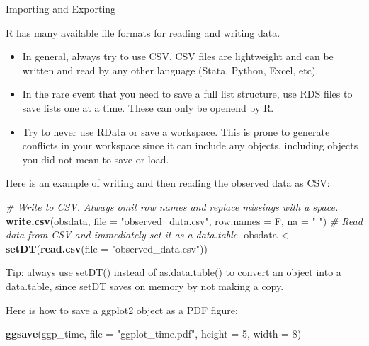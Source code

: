 \documentclass[10pt,ignorenonframetext,]{beamer}
\newenvironment{Shaded}{\begin{snugshade}}{\end{snugshade}}
\newcommand{\KeywordTok}[1]{\textcolor[rgb]{0.13,0.29,0.53}{\textbf{{#1}}}}
\newcommand{\DataTypeTok}[1]{\textcolor[rgb]{0.13,0.29,0.53}{{#1}}}
\newcommand{\DecValTok}[1]{\textcolor[rgb]{0.00,0.00,0.81}{{#1}}}
\newcommand{\StringTok}[1]{\textcolor[rgb]{0.31,0.60,0.02}{{#1}}}
\newcommand{\CommentTok}[1]{\textcolor[rgb]{0.56,0.35,0.01}{\textit{{#1}}}}
\newcommand{\NormalTok}[1]{{#1}}
\providecommand{\tightlist}{%
\setlength{\itemsep}{0pt}\setlength{\parskip}{0pt}}
\begin{document}
\begin{frame}[fragile]{Importing and Exporting}

R has many available file formats for reading and writing data.

\begin{itemize}
\tightlist
\item
  In general, always try to use CSV. CSV files are lightweight and can
  be written and read by any other language (Stata, Python, Excel, etc).
\item
  In the rare event that you need to save a full list structure, use RDS
  files to save lists one at a time. These can only be openend by R.
\item
  Try to never use RData or save a workspace. This is prone to generate
  conflicts in your workspace since it can include any objects,
  including objects you did not mean to save or load.
\end{itemize}

Here is an example of writing and then reading the observed data as CSV:

\footnotesize

\begin{Shaded}
\begin{Highlighting}[]
\CommentTok{# Write to CSV. Always omit row names and replace missings with a space.}
\KeywordTok{write.csv}\NormalTok{(obsdata, }\DataTypeTok{file =} \StringTok{"observed_data.csv"}\NormalTok{, }\DataTypeTok{row.names =} \NormalTok{F, }\DataTypeTok{na =} \StringTok{" "}\NormalTok{)}
\CommentTok{# Read data from CSV and immediately set it as a data.table.}
\NormalTok{obsdata <-}\StringTok{ }\KeywordTok{setDT}\NormalTok{(}\KeywordTok{read.csv}\NormalTok{(}\DataTypeTok{file =} \StringTok{"observed_data.csv"}\NormalTok{))}
\end{Highlighting}
\end{Shaded}

\normalsize

Tip: always use setDT() instead of as.data.table() to convert an object
into a data.table, since setDT saves on memory by not making a copy.

Here is how to save a ggplot2 object as a PDF figure:

\footnotesize

\begin{Shaded}
\begin{Highlighting}[]
\KeywordTok{ggsave}\NormalTok{(ggp_time, }\DataTypeTok{file =} \StringTok{"ggplot_time.pdf"}\NormalTok{, }\DataTypeTok{height =} \DecValTok{5}\NormalTok{, }\DataTypeTok{width =} \DecValTok{8}\NormalTok{)}
\end{Highlighting}
\end{Shaded}

\normalsize

\end{frame}
\end{document}

